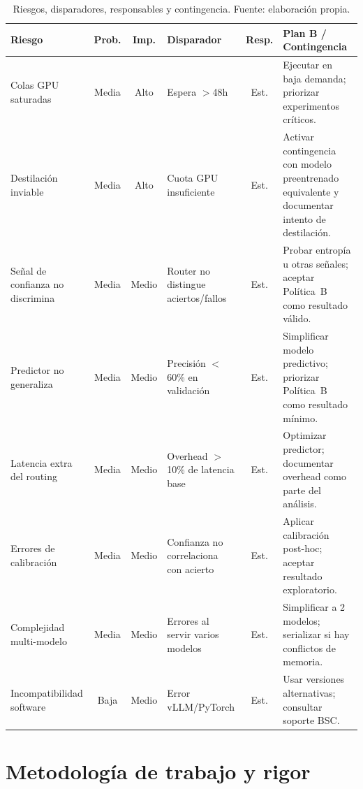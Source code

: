 \documentclass[11pt,a4paper]{article}
\begin{document}
\begin{table}[H]
\centering
\caption{Riesgos, disparadores, responsables y contingencia. Fuente: elaboración propia.}
\label{tab:risks}
\scriptsize
\setlength{\tabcolsep}{2pt}
\begin{tabularx}{\textwidth}{>{\raggedright\arraybackslash}p{2cm} c c >{\raggedright\arraybackslash}p{2.2cm} c >{\raggedright\arraybackslash}X}
\toprule
\textbf{Riesgo} & \textbf{Prob.} & \textbf{Imp.} & \textbf{Disparador} & \textbf{Resp.} & \textbf{Plan B / Contingencia} \\
\midrule
Colas GPU saturadas & Media & Alto & Espera $>$48h & Est. & Ejecutar en baja demanda; priorizar experimentos críticos. \\
\addlinespace
Destilación inviable & Media & Alto & Cuota GPU insuficiente & Est. & Activar contingencia con modelo preentrenado equivalente y documentar intento de destilación. \\
\addlinespace
Señal de confianza no discrimina & Media & Medio & Router no distingue aciertos/fallos & Est. & Probar entropía u otras señales; aceptar Política~B como resultado válido. \\
\addlinespace
Predictor no generaliza & Media & Medio & Precisión $<$60\% en validación & Est. & Simplificar modelo predictivo; priorizar Política~B como resultado mínimo. \\
\addlinespace
Latencia extra del routing & Media & Medio & Overhead $>$10\% de latencia base & Est. & Optimizar predictor; documentar overhead como parte del análisis. \\
\addlinespace
Errores de calibración & Media & Medio & Confianza no correlaciona con acierto & Est. & Aplicar calibración post-hoc; aceptar resultado exploratorio. \\
\addlinespace
Complejidad multi-modelo & Media & Medio & Errores al servir varios modelos & Est. & Simplificar a 2 modelos; serializar si hay conflictos de memoria. \\
\addlinespace
Incompatibilidad software & Baja & Medio & Error vLLM/PyTorch & Est. & Usar versiones alternativas; consultar soporte BSC. \\
\bottomrule
\end{tabularx}
\end{table}

\section{Metodología de trabajo y rigor}
\end{document}
